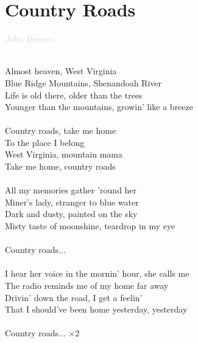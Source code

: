 \documentclass[a5paper, 10pt]{book}
\begin{document}
\newpage
\section{Country Roads}\textcolor{lightgray}{\textit{John Denver}}\\~\\
\begin{minipage}[t]{0.7\textwidth}
  Almost heaven, West Virginia\\
  Blue Ridge Mountains, Shenandoah River\\
  Life is old there, older than the trees\\
  Younger than the mountains, growin' like a breeze\\
  \\
  \hspace*{5mm}Country roads, take me home\\
  \hspace*{5mm}To the place I belong\\
  \hspace*{5mm}West Virginia, mountain mama\\
  \hspace*{5mm}Take me home, country roads\\
  \\
  All my memories gather 'round her\\
  Miner's lady, stranger to blue water\\
  Dark and dusty, painted on the sky\\
  Misty taste of moonshine, teardrop in my eye\\
  \\
  \hspace*{5mm}Country roads... \\
  \\
  I hear her voice in the mornin' hour, she calls me\\
  The radio reminds me of my home far away\\
  Drivin' down the road, I get a feelin'\\
  That I should've been home yesterday, yesterday\\
  \\
  \hspace*{5mm}Country roads... $\times$2\\
\end{minipage}
\end{document}
